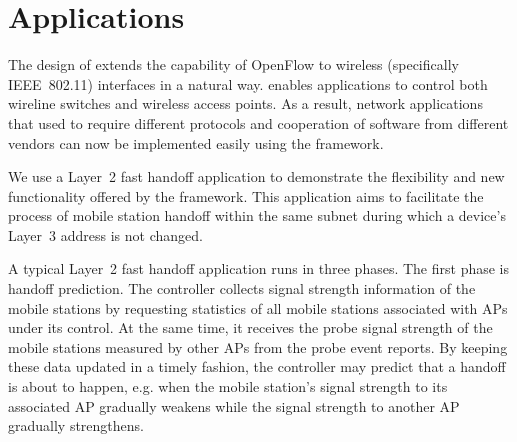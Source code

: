 \section{\aetherflow Applications}
\label{sec:application}
The design of \aetherflow extends the capability of OpenFlow to wireless
(specifically IEEE~802.11) interfaces in a natural way. \aetherflow enables applications to control both wireline switches and wireless access points. 
As a result,
network applications that used to require different protocols and cooperation of
software from different vendors can now be implemented easily using the
\aetherflow framework. 

We use a Layer~2 fast handoff application to demonstrate the flexibility and new functionality offered by the \aetherflow framework. 
This application
aims to facilitate the process of mobile station handoff within the same subnet
during which a device's Layer~3 address is not changed.



A typical Layer~2 fast handoff application runs in three phases. The
first phase is handoff prediction. The controller collects signal
strength information of the mobile stations by requesting statistics
of all mobile stations associated with APs under its control. At the same
time, it receives the probe signal strength of the mobile stations measured by
other APs from the probe event reports. By keeping these data updated in a
timely fashion, the controller may predict that a handoff is about to happen, e.g.
when the mobile station's signal strength to its associated AP gradually weakens
while the signal strength to another AP gradually strengthens. 

